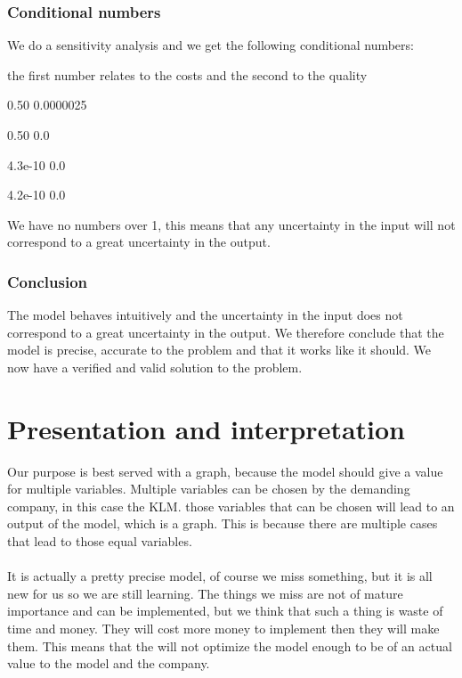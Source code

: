 \documentclass[a4paper, 11pt, notitlepage]{report}
\begin{document}
\subsection{Conditional numbers} We do a sensitivity analysis and we get the following conditional numbers:
\begin{description}
\item the first number relates to the costs and the second to the quality
	\item[Vescort]	0.50	0.0000025
	\item[WheelchairsPerMaintainer]		0.50	0.0
	\item[TotalCostWheelchair]		4.3e-10	0.0
	\item[TimeTillDestructionPerYear]		4.2e-10	0.0
	\end{description}
	We have no numbers over 1, this means that any uncertainty in the input will not correspond to a great uncertainty in the output.
	
\subsection{Conclusion} The model behaves intuitively and the uncertainty in the input does not correspond to a great uncertainty in the output. We therefore conclude that the model is precise, accurate to the problem and that it works like it should. We now have a verified and valid solution to the problem.

\chapter{Presentation and interpretation}
Our purpose is best served with a graph, because the model should give a value for multiple variables. Multiple variables can be chosen by the demanding company, in this case the KLM. those variables that can be chosen will lead to an output of the model, which is a graph. This is because there are multiple cases that lead to those equal variables.  \\ \\

It is actually a pretty precise model, of course we miss something, but it is all new for us so we are still learning. The things we miss are not of mature importance and can be implemented, but we think that such a thing is waste of time and money. They will cost more money to implement then they will make them. This means that the will not optimize the model enough to be of an actual value to the model and the company.
\setcounter{chapter}{+18}
\end{document}
